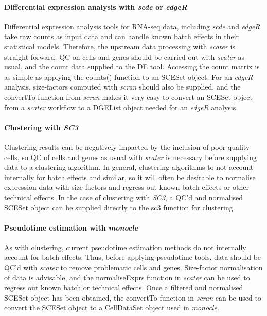 \documentclass[10pt,letterpaper]{article}
\begin{document}
\paragraph{Differential expression analysis with \emph{scde} or \emph{edgeR}} Differential expression analysis tools for RNA-seq data, including \emph{scde} and \emph{edgeR} take raw counts as input data and can handle known batch effects in their statistical models. Therefore, the upstream data processing with \emph{scater} is straight-forward: QC on cells and genes should be carried out with \emph{scater} as usual, and the count data supplied to the DE tool. Accessing the count matrix is as simple as applying the counts() function to an SCESet object. For an \emph{edgeR} analysis, size-factors computed with \emph{scran} should also be supplied, and the convertTo function from \emph{scran} makes it very easy to convert an SCESet object from a \emph{scater} workflow to a DGEList object needed for an \emph{edgeR} analysis.

\paragraph{Clustering with \emph{SC3}} Clustering results can be negatively impacted by the inclusion of poor quality cells, so QC of cells and genes as usual with \emph{scater} is necessary before supplying data to a clustering algorithm. In general, clustering algorithms to not account internally for batch effects and similar, so it will often be desirable to normalise expression data with size factors and regress out known batch effects or other technical effects. In the case of clustering with \emph{SC3}, a QC'd and normalised SCESet object can be supplied directly to the sc3 function for clustering.

\paragraph{Pseudotime estimation with \emph{monocle}} As with clustering, current pseudotime estimation methods do not internally account for batch effects. Thus, before applying pseudotime tools, data should be QC'd with \emph{scater} to remove problematic cells and genes. Size-factor normalisation of data is advisable, and the normaliseExprs function in \emph{scater} can be used to regress out known batch or technical effects. Once a filtered and normalised SCESet object has been obtained, the convertTo function in \emph{scran} can be used to convert the SCESet object to a CellDataSet object used in \emph{monocle}. \newline
\end{document}
